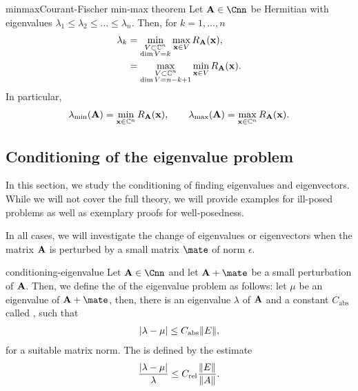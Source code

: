\begin{Theorem*}{minmax}{Courant-Fischer min-max theorem}
  Let $\mata\in\Cnn$ be Hermitian with eigenvalues
  $\lambda_1 \le \lambda_2\le\dots\le \lambda_n$. Then, for $k=1,\dots,n$
  \begin{align}
    \lambda_k
    &= \min_{\substack{V \subset \mathbb C^n\\\dim V = k}} \max_{\mathbf x\in V} R_\mathbf A(\mathbf x),\\
    &= \max_{\substack{V \subset \mathbb C^n\\\dim V = n-k+1}} \min_{\mathbf x\in V} R_\mathbf A(\mathbf x).
  \end{align}
  In particular,
  \begin{gather}
    \lambda_{\min}(\mathbf A) = \min_{\mathbf x\in\mathbb C^n} R_\mathbf A(\mathbf x),
    \qquad
    \lambda_{\max}(\mathbf A) = \max_{\mathbf x\in\mathbb C^n} R_\mathbf A(\mathbf x).
  \end{gather}
\end{Theorem*}

\subsection{Conditioning of the eigenvalue problem}

In this section, we study the conditioning of finding eigenvalues and
eigenvectors. While we will not cover the full theory, we will provide
examples for ill-posed problems as well as exemplary proofs for
well-posedness.

In all cases, we will investigate the change of eigenvalues or
eigenvectors when the matrix $\mathbf A$ is perturbed by a small matrix
$\mate$ of norm $\epsilon$.

\begin{Definition}{conditioning-eigenvalue}
  Let $\mata\in\Cnn$ and let $\mata+\mate$ be a small perturbation of $\mathbf A$. Then, we define the  of the eigenvalue problem as follows: let $\mu$ be an eigenvalue of $\mata+\mate$, then, there is an eigenvalue $\lambda$ of $\mathbf A$ and a constant $C_{\text{abs}}$ called , such that
  \begin{gather*}
    \lvert\lambda-\mu\rvert \le C_{\text{abs}} \lVert E\rVert,
  \end{gather*}
  for a suitable matrix norm. The  is defined by
  the estimate
  \begin{gather*}
    \frac{\lvert\lambda-\mu\rvert}{\lambda}
    \le C_{\text{rel}} \frac{\lVert E\rVert}{\lVert A\rVert}.
  \end{gather*}
\end{Definition}

